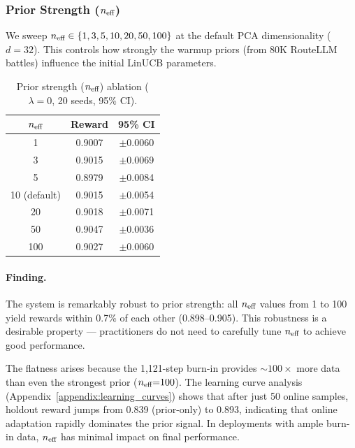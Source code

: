 \subsubsection{Prior Strength ($n_{\text{eff}}$)}

We sweep $n_{\text{eff}} \in \{1, 3, 5, 10, 20, 50, 100\}$ at the default
PCA dimensionality ($d{=}32$).  This controls how strongly the warmup priors
(from 80K RouteLLM battles) influence the initial LinUCB parameters.

\begin{table}[h]
\centering
\caption{Prior strength ($n_{\text{eff}}$) ablation ($\lambda{=}0$, 20 seeds, 95\% CI).}
\label{tab:neff_ablation}
\small
\begin{tabular}{@{}ccc@{}}
\toprule
$n_{\text{eff}}$ & \textbf{Reward} & \textbf{95\% CI} \\
\midrule
1                 & 0.9007 & $\pm$0.0060 \\
3                 & 0.9015 & $\pm$0.0069 \\
5                 & 0.8979 & $\pm$0.0084 \\
10 (default)      & 0.9015 & $\pm$0.0054 \\
20                & 0.9018 & $\pm$0.0071 \\
50                & 0.9047 & $\pm$0.0036 \\
100               & 0.9027 & $\pm$0.0060 \\
\bottomrule
\end{tabular}
\end{table}

\paragraph{Finding.}
The system is remarkably robust to prior strength: all $n_{\text{eff}}$ values from
1 to 100 yield rewards within 0.7\% of each other (0.898--0.905).  This
robustness is a desirable property --- practitioners do not need to
carefully tune $n_{\text{eff}}$ to achieve good performance.

The flatness arises because the 1,121-step burn-in provides
${\sim}100\times$ more data than even the strongest prior ($n_{\text{eff}}{=}100$).
The learning curve analysis (Appendix~\ref{appendix:learning_curves}) shows
that after just 50 online samples, holdout reward jumps from 0.839
(prior-only) to 0.893, indicating that online adaptation rapidly dominates
the prior signal.  In deployments with ample burn-in data, $n_{\text{eff}}$ has
minimal impact on final performance.

